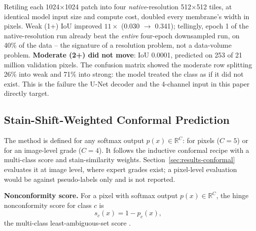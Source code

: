 \documentclass[conference]{IEEEtran}
\begin{document}
Retiling each 1024$\times$1024 patch into four \emph{native}-resolution
512$\times$512 tiles, at identical model input size and compute cost,
doubled every membrane's width in pixels. Weak (1+) IoU improved
$11\times$ (0.030 $\to$ 0.341); tellingly, epoch 1 of the native-resolution
run already beat the \emph{entire} four-epoch downsampled run, on 40\% of
the data -- the signature of a resolution problem, not a data-volume
problem. \textbf{Moderate (2+) did not move}: IoU 0.0001, predicted on 253
of 21 million validation pixels. The confusion matrix showed the moderate
row splitting 26\% into weak and 71\% into strong: the model treated the
class as if it did not exist. This is the failure the U-Net decoder and the
4-channel input in this paper directly target.

\subsection{Stain-Shift-Weighted Conformal Prediction}
\label{sec:conformal-method}

The method is defined for any softmax output $p(x)\in\mathbb{R}^C$: for
pixels ($C=5$) or for an image-level grade ($C=4$). It follows the inductive
conformal recipe with a multi-class score and stain-similarity weights.
Section~\ref{sec:results-conformal} evaluates it at image level, where expert grades exist;
a pixel-level evaluation would be against pseudo-labels only and is not reported.

\textbf{Nonconformity score.} For a pixel with softmax output $p(x) \in
\mathbb{R}^C$, the hinge nonconformity score for class $c$ is
\begin{equation}
s_c(x) = 1 - p_c(x),
\end{equation}
the multi-class least-ambiguous-set score \cite{sadinle2019}.
\end{document}
